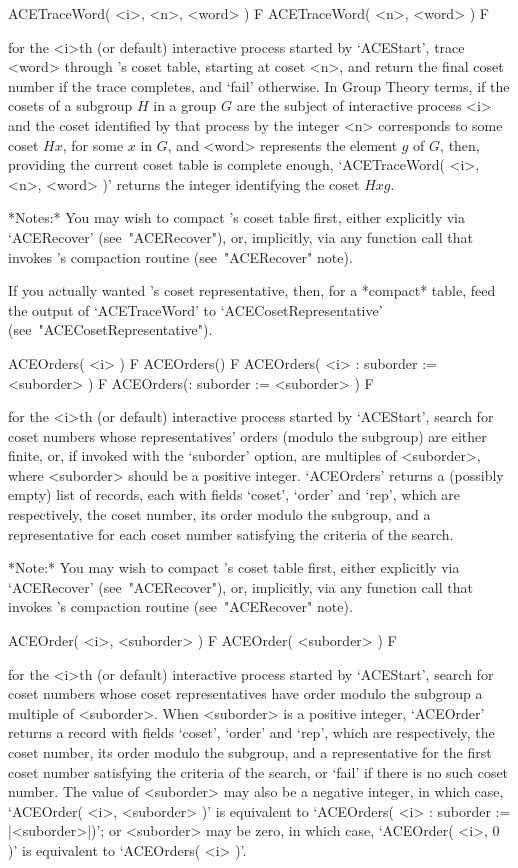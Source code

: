 \>ACETraceWord( <i>, <n>, <word> ) F
\>ACETraceWord( <n>, <word> ) F

for the <i>th (or  default)  interactive  {\ACE}  process  started  by
`ACEStart', trace <word> through {\ACE}'s  coset  table,  starting  at
coset <n>, and return the final coset number if the  trace  completes,
and `fail' otherwise. In Group  Theory  terms,  if  the  cosets  of  a
subgroup $H$ in a group $G$ are  the  subject  of  interactive  {\ACE}
process <i> and the coset identified by that process  by  the  integer
<n> corresponds to some coset $Hx$, for some $x$ in  $G$,  and  <word>
represents the element $g$ of $G$, then, providing the  current  coset
table is complete enough, `ACETraceWord( <i>, <n>, <word>  )'  returns
the integer identifying the coset $Hxg$.

*Notes:*
You may wish to compact {\ACE}'s coset table first, either  explicitly
via `ACERecover' (see~"ACERecover"), or, implicitly, via any  function
call that invokes {\ACE}'s compaction routine (see~"ACERecover" note).

If you actually wanted {\ACE}'s  coset  representative,  then,  for  a
*compact*   table,   feed   the   output    of    `ACETraceWord'    to
`ACECosetRepresentative' (see~"ACECosetRepresentative").

\>ACEOrders( <i> ) F
\>ACEOrders() F
\>ACEOrders( <i> : suborder := <suborder> ) F
\>ACEOrders(: suborder := <suborder> ) F

for the <i>th (or  default)  interactive  {\ACE}  process  started  by
`ACEStart', search for coset  numbers  whose  representatives'  orders
(modulo the subgroup) are either  finite,  or,  if  invoked  with  the
`suborder' option,  are  multiples  of  <suborder>,  where  <suborder>
should be a positive integer. `ACEOrders' returns a  (possibly  empty)
list of records, each with fields `coset', `order'  and  `rep',  which
are respectively, the coset number, its order modulo the subgroup, and
a representative for each coset number satisfying the criteria of  the
search. 

*Note:*
You may wish to compact {\ACE}'s coset table first, either  explicitly
via `ACERecover' (see~"ACERecover"), or, implicitly, via any  function
call that invokes {\ACE}'s compaction routine (see~"ACERecover" note).

\>ACEOrder( <i>, <suborder> ) F
\>ACEOrder( <suborder> ) F

for the <i>th (or  default)  interactive  {\ACE}  process  started  by
`ACEStart', search for coset numbers whose coset representatives  have
order modulo the subgroup a multiple of <suborder>. When <suborder> is
a positive integer, `ACEOrder' returns a record with  fields  `coset',
`order' and `rep', which are respectively, the coset number, its order
modulo the subgroup, and a representative for the first  coset  number
satisfying the criteria of the search, or `fail' if there is  no  such
coset number. The value of <suborder> may also be a negative  integer,
in  which  case,  `ACEOrder(  <i>,  <suborder>  )'  is  equivalent  to
`ACEOrders( <i> : suborder := |<suborder>|)';  or  <suborder>  may  be
zero, in which case, `ACEOrder( <i>, 0 )' is equivalent to `ACEOrders(
<i> )'.

